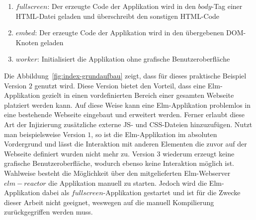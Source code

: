 \begin{enumerate}
\item{$fullscreen$}: Der erzeugte Code der Applikation wird in den $body$-Tag einer \ac{HTML}-Datei geladen und überschreibt den sonstigen \ac{HTML}-Code

\item{$embed$}: Der erzeugte Code der Applikation wird in den übergebenen DOM-Knoten geladen

\item{$worker$}: Initialisiert die Applikation ohne grafische Benutzeroberfläche
\end{enumerate}
Die Abbildung~\ref{fig:index-grundaufbau} zeigt, dass für dieses praktische Beispiel Version $2$ genutzt wird. Diese Version bietet den Vorteil, dass eine Elm-Applikation gezielt in einen vordefinierten Bereich einer gesamten Webseite platziert werden kann. Auf diese Weise kann eine Elm-Applikation problemlos in eine bestehende Webseite eingebaut und erweitert werden. Ferner erlaubt diese Art der Injizierung zusätzliche externe \ac{JS}- und \ac{CSS}-Dateien hinzuzufügen.
Nutzt man beispielsweise Version $1$, so ist die Elm-Applikation im absoluten Vordergrund und lässt die Interaktion mit anderen Elementen die zuvor auf der Webseite definiert wurden nicht mehr zu. Version $3$ wiederum erzeugt keine grafische Benutzeroberfläche, wodurch ebenso keine Interaktion möglich ist.
Wahlweise besteht die Möglichkeit über den mitgelieferten Elm-Webserver $elm-reactor$ die Applikation manuell zu starten. Jedoch wird die Elm-Applikation dabei als $fullscreen$-Applikation gestartet und ist für die Zwecke dieser Arbeit nicht geeignet, weswegen auf die manuell Kompilierung zurückgegriffen werden muss.

